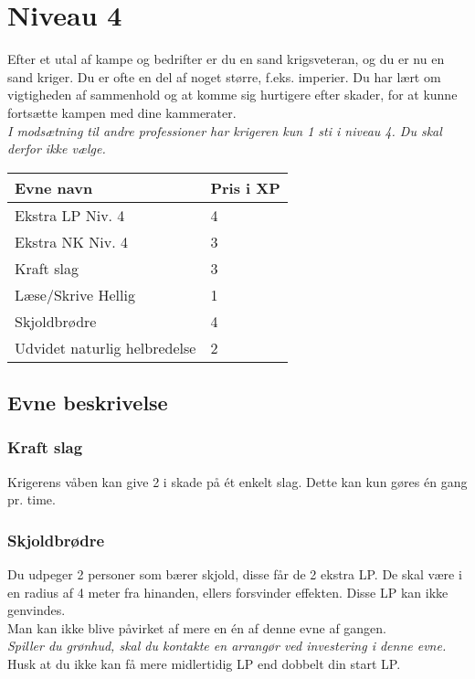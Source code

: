\chapter{Niveau 4}

Efter et utal af kampe og bedrifter er du en sand krigsveteran, og du er nu en sand kriger. Du er ofte en del af noget større, f.eks. imperier. Du har lært om vigtigheden af sammenhold og at komme sig hurtigere efter skader, for at kunne fortsætte kampen med dine kammerater.\\
\emph{I modsætning til andre professioner har krigeren kun 1 sti i niveau 4. Du skal derfor ikke vælge.}\\

\begin{table}[H]
    \centering
    \begin{tabular}{|p{}|p{}|}
    \rowcolor{cerulean!80}\hline
        Evne navn & Pris i XP \\\hline
        Ekstra LP Niv. 4 & 4\\\hline
        Ekstra NK Niv. 4 & 3\\\hline
        Kraft slag & 3 \\\hline
        Læse/Skrive Hellig & 1 \\\hline
        Skjoldbrødre & 4\\\hline
        Udvidet naturlig helbredelse & 2 \\\hline
    \end{tabular}
\end{table}

\section{Evne beskrivelse}





\subsection{Kraft slag}
Krigerens våben kan give 2 i skade på ét enkelt slag. Dette kan kun gøres én gang pr. time.




\subsection{Skjoldbrødre}
Du udpeger 2 personer som bærer skjold, disse får de 2 ekstra LP. De skal være i en radius af 4 meter fra hinanden, ellers forsvinder effekten. Disse LP kan ikke genvindes.\\
Man kan ikke blive påvirket af mere en én af denne evne af gangen.\\
\emph{Spiller du grønhud, skal du kontakte en arrangør ved investering i denne evne.}\\
Husk at du ikke kan få mere midlertidig LP end dobbelt din start LP.\\

